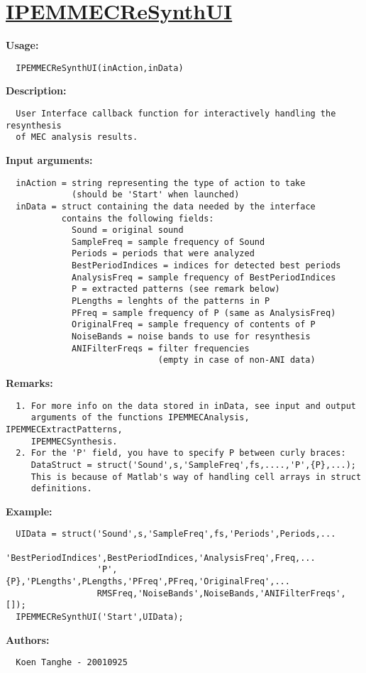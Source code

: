 \newpage
\section*{\hyperlink{Concepts:IPEMMECReSynthUI}{IPEMMECReSynthUI}}
\hypertarget{FuncRef:IPEMMECReSynthUI}{}

\textbf{Usage:}
\begin{verbatim}  IPEMMECReSynthUI(inAction,inData)

\end{verbatim}
\textbf{Description:}
\begin{verbatim}  User Interface callback function for interactively handling the resynthesis
  of MEC analysis results.

\end{verbatim}
\textbf{Input arguments:}
\begin{verbatim}  inAction = string representing the type of action to take
             (should be 'Start' when launched)
  inData = struct containing the data needed by the interface
           contains the following fields:
             Sound = original sound
             SampleFreq = sample frequency of Sound
             Periods = periods that were analyzed
             BestPeriodIndices = indices for detected best periods
             AnalysisFreq = sample frequency of BestPeriodIndices
             P = extracted patterns (see remark below)
             PLengths = lenghts of the patterns in P
             PFreq = sample frequency of P (same as AnalysisFreq)
             OriginalFreq = sample frequency of contents of P
             NoiseBands = noise bands to use for resynthesis
             ANIFilterFreqs = filter frequencies
                              (empty in case of non-ANI data)

\end{verbatim}
\textbf{Remarks:}
\begin{verbatim}  1. For more info on the data stored in inData, see input and output
     arguments of the functions IPEMMECAnalysis, IPEMMECExtractPatterns,
     IPEMMECSynthesis.
  2. For the 'P' field, you have to specify P between curly braces:
     DataStruct = struct('Sound',s,'SampleFreq',fs,....,'P',{P},...);
     This is because of Matlab's way of handling cell arrays in struct
     definitions.

\end{verbatim}
\textbf{Example:}
\begin{verbatim}  UIData = struct('Sound',s,'SampleFreq',fs,'Periods',Periods,...
                  'BestPeriodIndices',BestPeriodIndices,'AnalysisFreq',Freq,...
                  'P',{P},'PLengths',PLengths,'PFreq',PFreq,'OriginalFreq',...
                  RMSFreq,'NoiseBands',NoiseBands,'ANIFilterFreqs',[]);
  IPEMMECReSynthUI('Start',UIData);

\end{verbatim}
\textbf{Authors:}
\begin{verbatim}  Koen Tanghe - 20010925
\end{verbatim}


